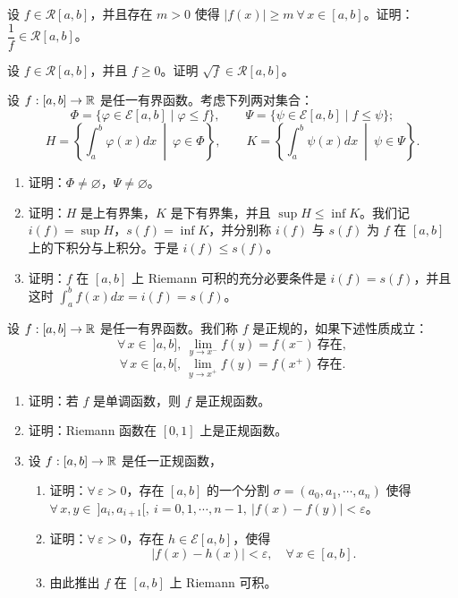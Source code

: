 \begin{exercise}
	\item 设 \(f\in\mathscr{R}[a,b]\)，并且存在 \(m>0\) 使得 \(|f(x)|\ge m\ \forall\,x\in[a,b]\)。证明：\(\dfrac1f\in\mathscr{R}[a,b]\)。
\end{exercise}

\begin{exercise}
	\item 设 \(f\in\mathscr{R}[a,b]\)，并且 \(f\ge0\)。证明 \(\sqrt f\in\mathscr{R}[a,b]\)。
\end{exercise}

\begin{exercise}
	\item 设 \(f:[a,b]\to\mathbb{R}\) 是任一有界函数。考虑下列两对集合：
	\[
	\Phi=\{\varphi\in\mathscr{E}[a,b]\mid\varphi\le f\},\qquad \Psi=\{\psi\in\mathscr{E}[a,b]\mid f\le\psi\};
	\]
	\[
	H=\left\{\int_a^b\varphi(x)dx\ \middle|\ \varphi\in\Phi\right\},\qquad K=\left\{\int_a^b\psi(x)dx\ \middle|\ \psi\in\Psi\right\}.
	\]
	\begin{enumerate}[label=\arabic*)]
		\item 证明：\(\Phi\neq\varnothing\)，\(\Psi\neq\varnothing\)。
		\item 证明：\(H\) 是上有界集，\(K\) 是下有界集，并且 \(\sup H\le\inf K\)。我们记 \(i(f)=\sup H\)，\(s(f)=\inf K\)，并分别称 \(i(f)\) 与 \(s(f)\) 为 \(f\) 在 \([a,b]\) 上的下积分与上积分。于是 \(i(f)\le s(f)\)。
		\item 证明：\(f\) 在 \([a,b]\) 上 Riemann 可积的充分必要条件是 \(i(f)=s(f)\)，并且这时 \(\displaystyle\int_a^b f(x)dx=i(f)=s(f)\)。
	\end{enumerate}
\end{exercise}

\begin{exercise}
	\item 设 \(f:[a,b]\to\mathbb{R}\) 是任一有界函数。我们称 \(f\) 是正规的，如果下述性质成立：
	\[
	\forall\,x\in\ ]a,b],\ \lim_{y\to x^-}f(y)=f(x^-)\ \text{存在},
	\]
	\[
	\forall\,x\in[a,b[,\ \lim_{y\to x^+}f(y)=f(x^+)\ \text{存在}.
	\]
	\begin{enumerate}[label=\arabic*)]
		\item 证明：若 \(f\) 是单调函数，则 \(f\) 是正规函数。
		\item 证明：Riemann 函数在 \([0,1]\) 上是正规函数。
		\item 设 \(f:[a,b]\to\mathbb{R}\) 是任一正规函数，
		\begin{enumerate}[label=\alph*)]
			\item 证明：\(\forall\,\varepsilon>0\)，存在 \([a,b]\) 的一个分割 \(\sigma=(a_0,a_1,\cdots,a_n)\) 使得 \(\forall\,x,y\in\ ]a_i,a_{i+1}[,\ i=0,1,\cdots,n-1,\ |f(x)-f(y)|<\varepsilon\)。
			\item 证明：\(\forall\,\varepsilon>0\)，存在 \(h\in\mathscr{E}[a,b]\)，使得
			\[
			|f(x)-h(x)|<\varepsilon,\quad\forall\,x\in[a,b].
			\]
			\item 由此推出 \(f\) 在 \([a,b]\) 上 Riemann 可积。
		\end{enumerate}
	\end{enumerate}
\end{exercise}

